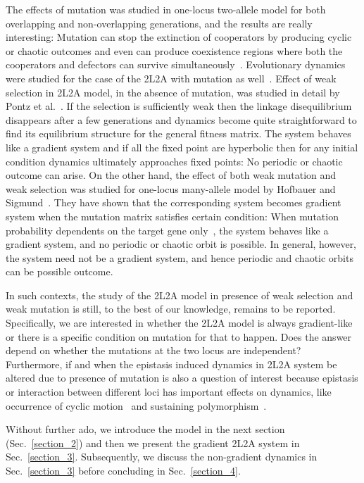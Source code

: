 \documentclass[
 pre,
 aps,
 a4paper,
 english,
 showkeys,
 reprint,
 twocolumn,
 superscriptaddress
]{revtex4}
\begin{document}
The effects of mutation was studied in one-locus two-allele model for both overlapping and non-overlapping generations, and the results are really interesting: Mutation can stop the extinction of cooperators by producing cyclic or chaotic outcomes and even can produce coexistence regions where both the cooperators and defectors can survive simultaneously~\cite{Mobilia2010jtb,toupo2015PRE,mittal2020pre,mukhopadhyaysuman2021JPhysComplexity}. Evolutionary dynamics were studied for the case of the 2L2A with mutation as well~\cite{park2011JMB,qu2020FrontierGenetics,bengtsson1983TPB,Jain2011jnmp,Brger1989genetics,christiansen1977ajhg,Karlin1971tpb}. Effect of weak selection in 2L2A model, in the absence of mutation, was studied in detail by Pontz et al.~{\cite{pontz2018JMB}}. If the selection is sufficiently weak then the linkage disequilibrium disappears after a few generations and dynamics become quite straightforward to find its equilibrium structure for the general fitness matrix. The system behaves like a gradient system and if all the fixed point are hyperbolic then for any initial condition dynamics ultimately approaches fixed points: No periodic or chaotic outcome can arise. On the other hand, the effect of both weak mutation and weak selection was studied for one-locus many-allele model by Hofbauer and Sigmund~\cite{hofbauer1998book}. They have shown that the corresponding system becomes gradient system when the mutation matrix satisfies certain condition: When mutation probability dependents on the target gene only~\cite{Hofbauer1985jmb}, the system behaves like a gradient system, and no periodic or chaotic orbit is possible. In general, however, the system need not be a gradient system, and hence periodic and chaotic orbits can be possible outcome. 

In such contexts, the study of the 2L2A model in presence of weak selection and weak mutation is still, to the best of our knowledge, remains to be reported. Specifically, we are interested in whether the 2L2A model is always gradient-like or  there is a specific condition on mutation for that to happen. Does the answer depend on whether the mutations at the two locus are independent? Furthermore, if and when the epistasis induced dynamics in 2L2A system be altered due to presence of mutation is also a question of interest because epistasis or interaction between different loci has important effects on dynamics, like occurrence of cyclic motion~\cite{hastings1981PNAS} and sustaining polymorphism~\cite{pontz2018JMB}.

Without further ado, we introduce the model in the next section (Sec.~\ref{section_2}) and then we present the gradient 2L2A system in Sec.~\ref{section_3}. Subsequently, we discuss the non-gradient dynamics in Sec.~\ref{section_3} before concluding in Sec.~\ref{section_4}.
\end{document}
